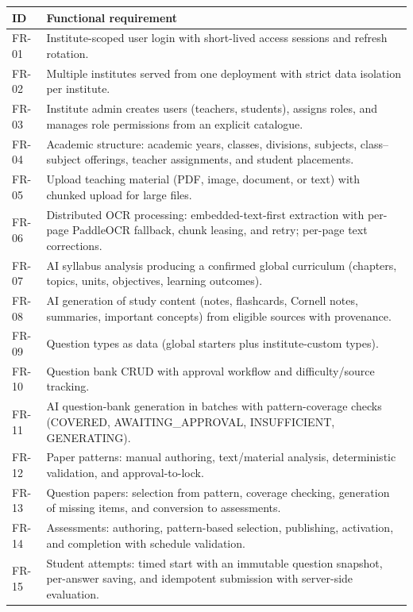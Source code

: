 \begin{center}
\small
\begin{longtable}{@{}p{1.6cm}p{12.4cm}@{}}
\toprule
\textbf{ID} & \textbf{Functional requirement} \\
\midrule
\endhead
FR-01 & Institute-scoped user login with short-lived access sessions and
refresh rotation. \\
FR-02 & Multiple institutes served from one deployment with strict data
isolation per institute. \\
FR-03 & Institute admin creates users (teachers, students), assigns roles, and
manages role permissions from an explicit catalogue. \\
FR-04 & Academic structure: academic years, classes, divisions, subjects,
class--subject offerings, teacher assignments, and student placements. \\
FR-05 & Upload teaching material (PDF, image, document, or text) with chunked
upload for large files. \\
FR-06 & Distributed OCR processing: embedded-text-first extraction with
per-page PaddleOCR fallback, chunk leasing, and retry; per-page text
corrections. \\
FR-07 & AI syllabus analysis producing a confirmed global curriculum (chapters,
topics, units, objectives, learning outcomes). \\
FR-08 & AI generation of study content (notes, flashcards, Cornell notes,
summaries, important concepts) from eligible sources with provenance. \\
FR-09 & Question types as data (global starters plus institute-custom types). \\
FR-10 & Question bank CRUD with approval workflow and difficulty/source
tracking. \\
FR-11 & AI question-bank generation in batches with pattern-coverage checks
(COVERED, AWAITING\_APPROVAL, INSUFFICIENT, GENERATING). \\
FR-12 & Paper patterns: manual authoring, text/material analysis, deterministic
validation, and approval-to-lock. \\
FR-13 & Question papers: selection from pattern, coverage checking, generation
of missing items, and conversion to assessments. \\
FR-14 & Assessments: authoring, pattern-based selection, publishing,
activation, and completion with schedule validation. \\
FR-15 & Student attempts: timed start with an immutable question snapshot,
per-answer saving, and idempotent submission with server-side evaluation. \\

\end{longtable}
\end{center}

